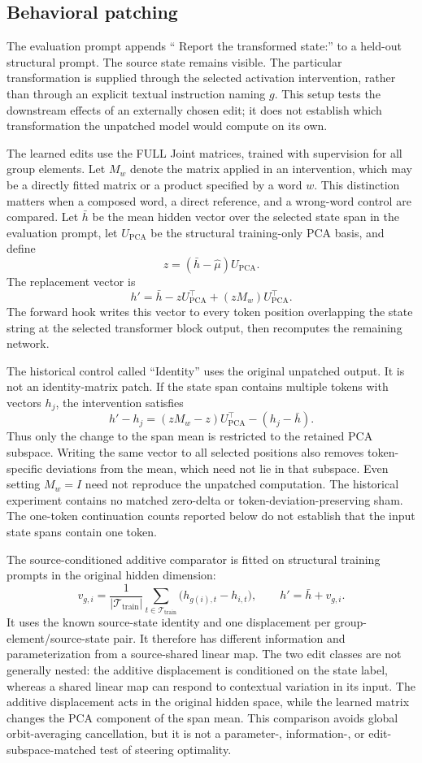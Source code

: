 \subsection{Behavioral patching}
\label{app:behavior}

The evaluation prompt appends
`` Report the transformed state:''
to a held-out structural prompt.
The source state remains visible.
The particular transformation is supplied through
the selected activation intervention, rather than
through an explicit textual instruction naming $g$.
This setup tests the downstream effects of an
externally chosen edit; it does not establish
which transformation the unpatched model would
compute on its own.

The learned edits use the FULL Joint matrices,
trained with supervision for all group elements.
Let $M_w$ denote the matrix applied in an intervention,
which may be a directly fitted matrix or a product
specified by a word $w$.
This distinction matters when a composed word,
a direct reference, and a wrong-word control
are compared.
Let $\bar h$ be the mean hidden vector over the
selected state span in the evaluation prompt,
let $U_{\mathrm{PCA}}$ be the structural training-only
PCA basis, and define
\[
 z=(\bar h-\hat\mu)U_{\mathrm{PCA}}.
\]
The replacement vector is
\[
 h'
 =
 \bar h-zU_{\mathrm{PCA}}^\top
 +(zM_w)U_{\mathrm{PCA}}^\top.
\]
The forward hook writes this vector to every token
position overlapping the state string at the selected
transformer block output, then recomputes the
remaining network.

The historical control called ``Identity'' uses the
original unpatched output.
It is not an identity-matrix patch.
If the state span contains multiple tokens with
vectors $h_j$, the intervention satisfies
\[
 h'-h_j
 =
 (zM_w-z)U_{\mathrm{PCA}}^\top
 - (h_j-\bar h).
\]
Thus only the change to the span mean is restricted
to the retained PCA subspace.
Writing the same vector to all selected positions
also removes token-specific deviations from the mean,
which need not lie in that subspace.
Even setting $M_w=I$ need not reproduce the
unpatched computation.
The historical experiment contains no matched
zero-delta or token-deviation-preserving sham.
The one-token continuation counts reported below
do not establish that the input state spans
contain one token.

The source-conditioned additive comparator is fitted
on structural training prompts in the original
hidden dimension:
\[
 v_{g,i}
 =
 \frac{1}{|\mathcal T_{\mathrm{train}}|}
 \sum_{t\in\mathcal T_{\mathrm{train}}}
 \bigl(h_{g(i),t}-h_{i,t}\bigr),
 \qquad
 h'=\bar h+v_{g,i}.
\]
It uses the known source-state identity and one
displacement per group-element/source-state pair.
It therefore has different information and
parameterization from a source-shared linear map.
The two edit classes are not generally nested:
the additive displacement is conditioned on the
state label, whereas a shared linear map can
respond to contextual variation in its input.
The additive displacement acts in the original
hidden space, while the learned matrix changes
the PCA component of the span mean.
This comparison avoids global orbit-averaging
cancellation, but it is not a parameter-,
information-, or edit-subspace-matched test of
steering optimality.

